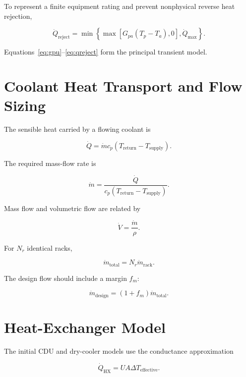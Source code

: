\documentclass[11pt]{article}
\begin{document}
To represent a finite equipment rating and prevent nonphysical reverse heat rejection,

\begin{equation}
\dot Q_{\mathrm{reject}}
=\min\left\{
\max\left[G_{pa}(T_p-T_a),0\right],
\dot Q_{\max}
\right\}.
\label{eq:qreject}
\end{equation}

Equations~\eqref{eq:gpu}--\eqref{eq:qreject} form the principal transient model.

\section{Coolant Heat Transport and Flow Sizing}

The sensible heat carried by a flowing coolant is

\begin{equation}
\dot Q=\dot m c_p(T_{\mathrm{return}}-T_{\mathrm{supply}}).
\label{eq:flowheat}
\end{equation}

The required mass-flow rate is

\begin{equation}
\dot m
=\frac{\dot Q}
{c_p(T_{\mathrm{return}}-T_{\mathrm{supply}})}.
\label{eq:mdot}
\end{equation}

Mass flow and volumetric flow are related by

\begin{equation}
\dot V=\frac{\dot m}{\rho}.
\end{equation}

For \(N_r\) identical racks,

\begin{equation}
\dot m_{\mathrm{total}}
=N_r\dot m_{\mathrm{rack}}.
\end{equation}

The design flow should include a margin \(f_m\):

\begin{equation}
\dot m_{\mathrm{design}}
=(1+f_m)\dot m_{\mathrm{total}}.
\end{equation}

\section{Heat-Exchanger Model}

The initial CDU and dry-cooler models use the conductance approximation

\begin{equation}
\dot Q_{\mathrm{HX}}=UA\Delta T_{\mathrm{effective}}.
\end{equation}
\end{document}

